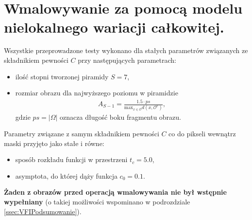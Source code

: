 \documentclass[12pt, twoside, openany]{report}
\theoremstyle{definition}
\begin{document}
\section{Wmalowywanie za pomocą modelu nielokalnego wariacji całkowitej.}
Wszystkie przeprowadzone testy wykonano dla stałych parametrów związanych ze składnikiem pewności $C$ przy następujących parametrach:
\begin{itemize}
\item
ilość stopni tworzonej piramidy $S=7$,
\item
rozmiar obrazu dla najwyższego poziomu w piramidzie 
\begin{align}
A_{S-1}=\frac{1.5 \cdot ps}{\mathrm{max}_{x \in \mathcal{O}}d(x,\mathcal{O}^{c})}
,
\end{align}
gdzie $ps = |\Omega|$ oznacza długość boku fragmentu obrazu.
\end{itemize}
Parametry związane z samym składnikiem pewności $C$ co do pikseli wewnątrz maski przyjęto jako stałe i równe:
\begin{itemize}
\item
sposób rozkładu funkcji w przestrzeni $t_{c}=5.0$,
\item 
asymptota, do której dąży funkcja $c_{0}=0.1$.
\end{itemize}
\textbf{Żaden z obrazów przed operacją wmalowywania nie był wstępnie wypełniany} (o takiej możliwości wspominano w podrozdziale \ref{ssec:VFIPodsumowanie}).
\end{document}
